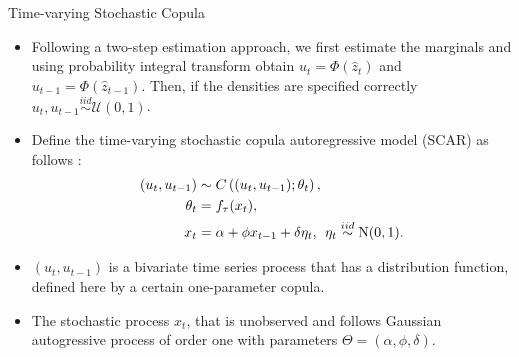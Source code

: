 \documentclass[9pt,xcolor=x11names,compress]{beamer}
\let\natbibcitep\citep
\renewcommand\citep{\bibpunct{(}{)}{;}{a}{,}{;}\natbibcitep}
\begin{document}
\begin{frame}{Time-varying Stochastic Copula}
	\begin{itemize}
		\item Following a two-step estimation approach, we first estimate the marginals and using probability integral transform obtain $u_t = \Phi(\hat{z}_t)$ and  $u_{t-1} =\Phi(\hat{z}_{t-1})$. Then, if the densities are specified correctly $u_t, u_{t-1}\stackrel{iid}{\sim}\mathcal{U}(0,1)$. 
		\item Define the time-varying stochastic copula autoregressive model (SCAR) as follows \citep{Hafner2012}:
		\begin{align} \notag
		(u_t,u_{t-1})&\sim C\left((u_t,u_{t-1});\theta_t\right),\nonumber\\  \label{f:theta_ktau}
		\theta_t&=f_{\tau}(x_t),\\ 
		x_t&=\alpha+\phi x_{t-1}+\delta\eta_t, \:\: \eta_t\stackrel{iid}{\sim} \text{N}(0,1).\nonumber
		\end{align}
	\item $(u_t,u_{t-1})$ is a bivariate time series process that has a distribution function, defined here by a certain one-parameter copula. 
	\item The stochastic process $x_t$, that is unobserved and follows Gaussian autogressive process of order one with parameters $\Theta = (\alpha,\phi,\delta)$. 
	\end{itemize}
\end{frame}
\end{document}
